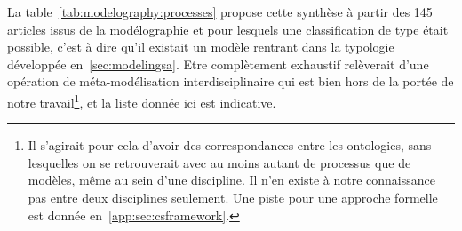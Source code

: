 



La table~\ref{tab:modelography:processes} propose cette synthèse à partir des 145 articles issus de la modélographie et pour lesquels une classification de type était possible, c'est à dire qu'il existait un modèle rentrant dans la typologie développée en~\ref{sec:modelingsa}. Etre complètement exhaustif relèverait d'une opération de méta-modélisation interdisciplinaire qui est bien hors de la portée de notre travail\footnote{Il s'agirait pour cela d'avoir des correspondances entre les ontologies, sans lesquelles on se retrouverait avec au moins autant de processus que de modèles, même au sein d'une discipline. Il n'en existe à notre connaissance pas entre deux disciplines seulement. Une piste pour une approche formelle est donnée en~\ref{app:sec:csframework}.}, et la liste donnée ici est indicative.


